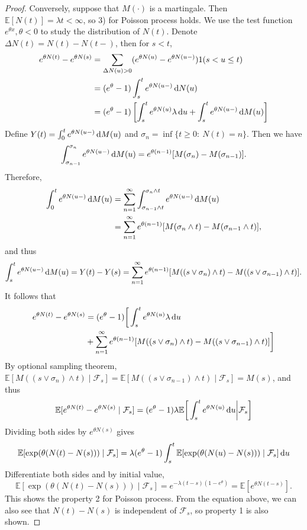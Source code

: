 \begin{proof}
Conversely, suppose that $M(\cdot)$ is a martingale.
Then $\mathbb{E}[N(t)]=\lambda t<\infty$, so 3) for Poisson process holds.
We use the test function $e^{\theta x}, \theta<0$ to study the distribution of $N(t)$.
Denote $\Delta N(t) = N(t) - N(t-)$, then for $s<t$, 
\begin{align*}
e^{\theta N(t)} - e^{\theta N(s)}&=\sum_{\Delta N(u)>0}(e^{\theta N(u)} - e^{\theta N(u-)})1(s<u\le t)\\
&=(e^{\theta}-1)\int_s^te^{\theta N(u-)}\,\mathrm{d} N(u)\\
&=(e^{\theta}-1)\left[\int_s^te^{\theta N(u)}\lambda\,\mathrm{d} u
+\int_s^te^{\theta N(u-)}\,\mathrm{d} M(u)
\right]
\end{align*}
Define $Y(t)=\int_0^te^{\theta N(u-)}\,\mathrm{d} M(u)$ and $\sigma_n=\inf\{t\ge0:~N(t)=n\}$. 
Then we have
\[
\int_{\sigma_{n-1}}^{\sigma_n}e^{\theta N(u-)}\,\mathrm{d} M(u) = e^{\theta(n-1)}[M(\sigma_n) - M(\sigma_{n-1})].
\]
Therefore,
\begin{align*}
\int_{0}^{t}e^{\theta N(u-)}\,\mathrm{d} M(u)&=\sum_{n=1}^\infty
\int_{\sigma_{n-1}\land t}^{\sigma_n\land t}e^{\theta N(u-)}\,\mathrm{d} M(u)\\
&=\sum_{n=1}^\infty
 e^{\theta(n-1)}[M(\sigma_n\land t) - M(\sigma_{n-1}\land t)],
\end{align*}
and thus
\[
\int_s^te^{\theta N(u-)}\,\mathrm{d} M(u)=Y(t)-Y(s)=\sum_{n=1}^\infty
 e^{\theta(n-1)}[M((s\lor\sigma_n)\land t) - M((s\lor\sigma_{n-1})\land t)].
\]
It follows that
\begin{align*}
e^{\theta N(t)} - e^{\theta N(s)}&=(e^{\theta}-1)\bigg[\int_s^te^{\theta N(u)}\lambda\,\mathrm{d} u\\&+\sum_{n=1}^\infty
 e^{\theta(n-1)}[M((s\lor\sigma_n)\land t) - M((s\lor\sigma_{n-1})\land t)]
\bigg]
\end{align*}
By optional sampling theorem, $\mathbb{E}[M((s\lor\sigma_n)\land t)\mid\mathcal{F}_s] = \mathbb{E}[M((s\lor\sigma_{n-1})\land t)\mid\mathcal{F}_s]=M(s)$, and thus 
\begin{align*}
\mathbb{E}[e^{\theta N(t)} - e^{\theta N(s)}\mid\mathcal{F}_s] =(e^{\theta}-1)\lambda\mathbb{E}\bigg[\int_s^te^{\theta N(u)}\,\mathrm{d} u\bigg|\mathcal{F}_s\bigg]
\end{align*}
Dividing both sides by $e^{\theta N(s)}$ gives
\[
\mathbb{E}[\exp(\theta(N(t) - N(s)))\mid\mathcal{F}_s] =\lambda(e^{\theta}-1)
\int_s^t\mathbb{E}[\exp(\theta(N(u) - N(s)))\mid\mathcal{F}_s]\,\mathrm{d} u
\]
Differentiate both sides and by initial value, 
\begin{equation}
\mathbb{E}[\exp(\theta(N(t) - N(s)))\mid\mathcal{F}_s] = e^{-\lambda(t-s)(1-e^{\theta})}=\mathbb{E}[e^{\theta N(t-s)}].
\end{equation}
This shows the property 2 for Poisson process.
From the equation above, we can also see that $N(t)-N(s)$ is independent of $\mathcal{F}_s$, so property 1 is also shown.
\end{proof}
